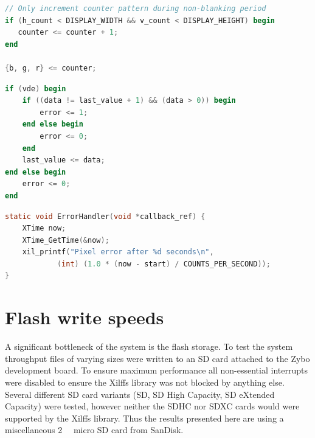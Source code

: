 \begin{lstlisting}[caption={Test pattern generator outputs an incrementing bit pattern.}, label={lst:test_pattern_generator}, language=Verilog]
// Only increment counter pattern during non-blanking period
if (h_count < DISPLAY_WIDTH && v_count < DISPLAY_HEIGHT) begin
   counter <= counter + 1;
end

{b, g, r} <= counter;
\end{lstlisting}

\begin{lstlisting}[caption={Test pattern checker ensures the received bit stream is the same as that sent.}, label={lst:pattern_checker}, language=Verilog]
if (vde) begin
    if ((data != last_value + 1) && (data > 0)) begin
        error <= 1;
    end else begin
        error <= 0;
    end
    last_value <= data;
end else begin
    error <= 0;
end
\end{lstlisting}

\begin{lstlisting}[caption={Interrupt handler for bit pattern error.}, label={lst:pattern_error}, language=C]
static void ErrorHandler(void *callback_ref) {
    XTime now;
    XTime_GetTime(&now);
    xil_printf("Pixel error after %d seconds\n",
            (int) (1.0 * (now - start) / COUNTS_PER_SECOND));
}
\end{lstlisting}


\section{Flash write speeds}

A significant bottleneck of the system is the flash storage. To test the system throughput files of varying sizes were written to an SD card attached to the Zybo development board. To ensure maximum performance all non-essential interrupts were disabled to ensure the Xilffs library was not blocked by anything else. Several different SD card variants (SD, SD High Capacity, SD eXtended Capacity) were tested, however neither the SDHC nor SDXC cards would were supported by the Xilffs library. Thus the results presented here are using a miscellaneous \SI{2}{\giga\byte} micro SD card from SanDisk.

